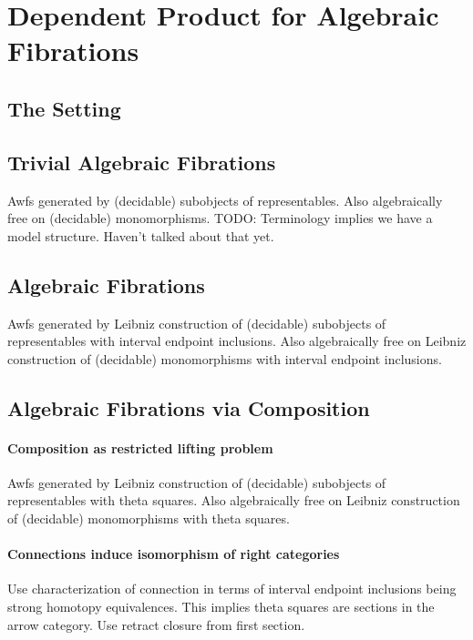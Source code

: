 \documentclass[reqno,10pt,a4paper,oneside]{amsart}
\begin{document}
\section{Dependent Product for Algebraic Fibrations}

\subsection{The Setting}

\subsection{Trivial Algebraic Fibrations}

Awfs generated by (decidable) subobjects of representables.
Also algebraically free on (decidable) monomorphisms.
TODO: Terminology implies we have a model structure.
Haven't talked about that yet.

\subsection{Algebraic Fibrations}

Awfs generated by Leibniz construction of (decidable) subobjects of representables with interval endpoint inclusions.
Also algebraically free on Leibniz construction of (decidable) monomorphisms with interval endpoint inclusions.

\subsection{Algebraic Fibrations via Composition}

\paragraph{Composition as restricted lifting problem}

Awfs generated by Leibniz construction of (decidable) subobjects of representables with theta squares.
Also algebraically free on Leibniz construction of (decidable) monomorphisms with theta squares.

\paragraph{Connections induce isomorphism of right categories}

Use characterization of connection in terms of interval endpoint inclusions being strong homotopy equivalences.
This implies theta squares are sections in the arrow category.
Use retract closure from first section.
\end{document}
